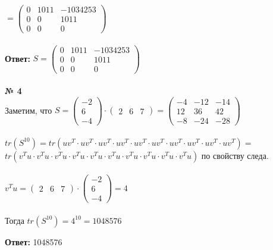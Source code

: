 \documentclass[a4paper, 12pt]{article}
\begin{document}
    \\
    \\
    \\$ = \begin{pmatrix}0 & 1011 & -1034253\\0 & 0 & 1011\\0 & 0 & 0\end{pmatrix}$
    \\
    \\ \textbf{Ответ: } $S = \begin{pmatrix}0 & 1011 & -1034253\\0 & 0 & 1011\\0 & 0 & 0\end{pmatrix}$
    \\
    \\ \textbf{№ 4}
    \\ Заметим, что $S = \begin{pmatrix}-2 \\ 6 \\-4 \end{pmatrix} \cdot \begin{pmatrix}2 & 6 & 7 \end{pmatrix} = \begin{pmatrix}-4 & -12 & -14\\12 & 36 & 42\\-8 & -24 & -28\end{pmatrix}$
    \\
    \\ $tr(S^{10}) = tr(uv^T \cdot uv^T \cdot uv^T \cdot uv^T \cdot uv^T \cdot uv^T \cdot uv^T \cdot uv^T \cdot uv^T \cdot uv^T) =$ 
    \\ $ tr(v^Tu \cdot v^Tu \cdot v^Tu \cdot v^Tu \cdot v^Tu \cdot v^Tu \cdot v^Tu \cdot v^Tu \cdot v^Tu \cdot v^Tu)$ по свойству следа.
    \\
    \\ $v^Tu = \begin{pmatrix}2 & 6 & 7 \end{pmatrix} \cdot \begin{pmatrix}-2 \\ 6 \\-4 \end{pmatrix} = 4$
    \\
    \\ Тогда $tr(S^{10}) = 4^10 = 1048576$
    \\
    \par \textbf{Ответ: } 1048576
    \\
    \\
\end{document}
